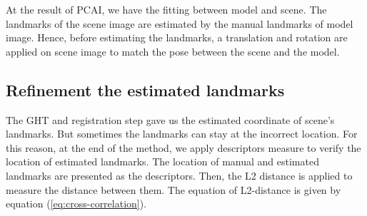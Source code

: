 \documentclass[twoside,twocolumn,10pt]{article}
\begin{document}
At the result of PCAI, we have the fitting between model and scene. The landmarks of the scene
image are estimated by the manual landmarks of model image. Hence, before estimating the
landmarks, a translation and rotation are applied on scene image to
match the pose between the scene and the model. 

\subsection{Refinement the estimated landmarks}
The GHT and registration step gave us the estimated coordinate of
scene's landmarks. But sometimes the landmarks can stay at the
incorrect location. For this reason, at the end of the method, we
apply descriptors measure\cite{lowe2004distinctive} to verify the location of
estimated landmarks. The location of manual and estimated landmarks
are presented as the descriptors. Then, the L2 distance is applied to
measure the distance between them. The equation of L2-distance is
given by equation (\ref{eq:cross-correlation}).
\end{document}
